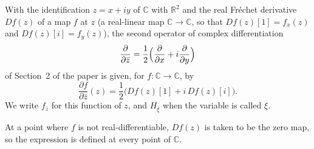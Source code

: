 \begin{definition}
With the identification $z=x+iy$ of $\mathbb{C}$ with $\mathbb{R}^2$ and the
real Fr\'echet derivative $Df(z)$ of a map $f$ at $z$ (a real-linear map
$\mathbb{C}\to\mathbb{C}$, so that $Df(z)[1]=f_x(z)$ and $Df(z)[i]=f_y(z)$),
the second operator of
complex differentiation
\[
  \frac{\partial}{\partial\bar z}=\frac12\Bigl(\frac{\partial}{\partial x}+i\frac{\partial}{\partial y}\Bigr)
\]
of Section~2 of the paper is given, for $f\colon\mathbb{C}\to\mathbb{C}$, by
\[
  \frac{\partial f}{\partial\bar z}(z)=\frac12\bigl(Df(z)[1]+i\,Df(z)[i]\bigr).
\]
We write $f_{\bar z}$ for this function of $z$, and $H_{\bar\xi}$ when the
variable is called $\xi$.

At a point where $f$ is not real-differentiable, $Df(z)$ is
taken to be the zero map, so the expression is defined at every point of
$\mathbb{C}$.
\end{definition}
